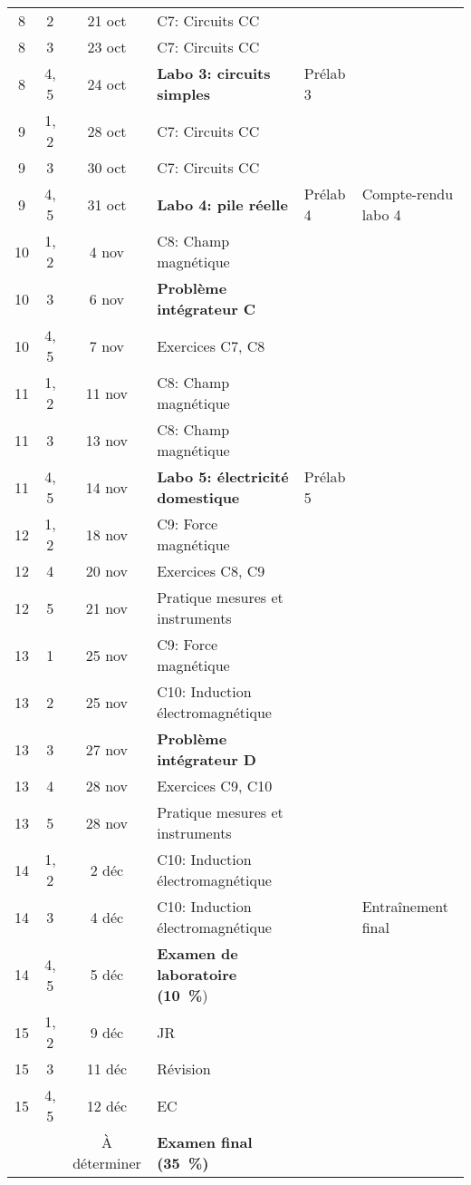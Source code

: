 \documentclass[10pt]{article}
\begin{document}
\begin{longtable}{cccp{6cm}lp{9cm}}
  8     &  2     &  21 oct   &  C7: Circuits CC  \\
  8     &  3     &  23 oct   &  C7: Circuits CC  &   &   \\
  8     &  4, 5  &  24 oct   &  \textbf{Labo 3: circuits simples}
    &  Prélab 3  &   \\
  \midrule
  9     &  1, 2  &  28 oct   &  C7: Circuits CC  \\
  9     &  3     &  30 oct   &  C7: Circuits CC  \\
  9     &  4, 5  &  31 oct   &  \textbf{Labo 4: pile réelle}
    &  Prélab 4  &  Compte-rendu labo 4 \\
  \midrule
  10    &  1, 2  &  4 nov    &  C8: Champ magnétique  \\*
  10    &  3     &  6 nov    &  \textbf{Problème intégrateur C} &   &    \\*
  10    &  4, 5  &  7 nov    &  Exercices C7, C8
    &    &   \\
  \midrule
  11    &  1, 2  &  11 nov   &  C8: Champ magnétique  \\
  11    &  3     &  13 nov   &  C8: Champ magnétique  \\
  11    &  4, 5  &  14 nov   &  \textbf{Labo 5: électricité domestique}
    &  Prélab 5  &    \\
  \midrule
  12    &  1, 2  &  18 nov   &  C9: Force magnétique  \\
  12    &  4     &  20 nov   &  Exercices C8, C9  &  &  \\
  12    &  5     &  21 nov   &  Pratique mesures et instruments  &  &  \\
  \midrule
  13    &  1     &  25 nov   &  C9: Force magnétique  \\
  13    &  2     &  25 nov   &  C10: Induction électromagnétique  \\
  13    &  3     &  27 nov   &  \textbf{Problème intégrateur D}  \\
  13    &  4     &  28 nov   &  Exercices C9, C10  \\
  13    &  5     &  28 nov   &  Pratique mesures et instruments  &  &  \\
  \midrule
  14    &  1, 2  &  2 déc    &  C10: Induction électromagnétique  \\
  14    &  3     &  4 déc    &  C10: Induction électromagnétique &  &  Entraînement final  \\
  14    &  4, 5  &  5 déc    &  \textbf{Examen de laboratoire (\qty{10}{\percent}})
    &    &   \\
  \midrule
  15    &  1, 2  &  9 déc    &  JR \\
  15    &  3     &  11 déc   &  Révision   \\
  15    &  4, 5  &  12 déc   &  EC
    &    &   \\
        &        & À déterminer  &  \textbf{Examen final (\qty{35}{\percent})}  \\
  \bottomrule
\end{longtable}
\end{document}
